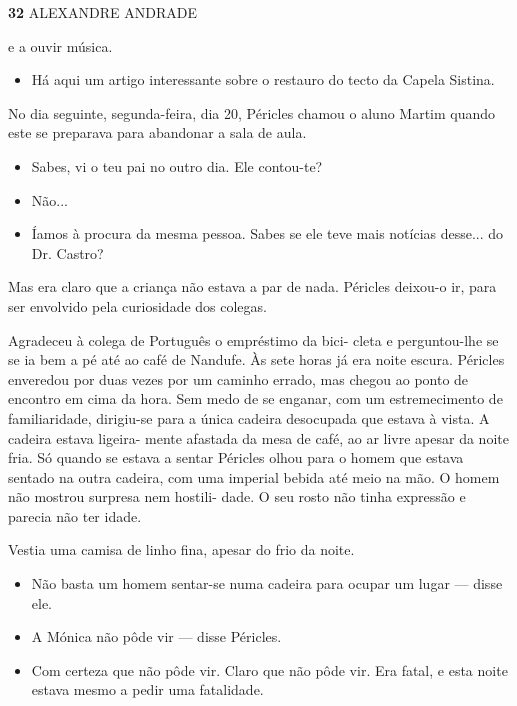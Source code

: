 \textbf{32 }ALEXANDRE ANDRADE

e a ouvir música.

\begin{itemize}
\tightlist
\item
  Há aqui um artigo interessante sobre o restauro do tecto da Capela
  Sistina.
\end{itemize}

No dia seguinte, segunda-feira, dia 20, Péricles chamou o aluno Martim
quando este se preparava para abandonar a sala de aula.

\begin{itemize}
\tightlist
\item
  Sabes, vi o teu pai no outro dia. Ele contou-te?
\item
  Não...
\item
  Íamos à procura da mesma pessoa. Sabes se ele teve mais notícias
  desse... do Dr. Castro?
\end{itemize}

Mas era claro que a criança não estava a par de nada. Péricles deixou-o
ir, para ser envolvido pela curiosidade dos colegas.

Agradeceu à colega de Português o empréstimo da bici- cleta e
perguntou-lhe se se ia bem a pé até ao café de Nandufe. Às sete horas já
era noite escura. Péricles enveredou por duas vezes por um caminho
errado, mas chegou ao ponto de encontro em cima da hora. Sem medo de se
enganar, com um estremecimento de familiaridade, dirigiu-se para a única
cadeira desocupada que estava à vista. A cadeira estava ligeira- mente
afastada da mesa de café, ao ar livre apesar da noite fria. Só quando se
estava a sentar Péricles olhou para o homem que estava sentado na outra
cadeira, com uma imperial bebida até meio na mão. O homem não mostrou
surpresa nem hostili- dade. O seu rosto não tinha expressão e parecia
não ter idade.

Vestia uma camisa de linho fina, apesar do frio da noite.

\begin{itemize}
\tightlist
\item
  Não basta um homem sentar-se numa cadeira para ocupar um lugar ---
  disse ele.
\item
  A Mónica não pôde vir --- disse Péricles.
\item
  Com certeza que não pôde vir. Claro que não pôde vir. Era fatal, e
  esta noite estava mesmo a pedir uma fatalidade.
\end{itemize}


